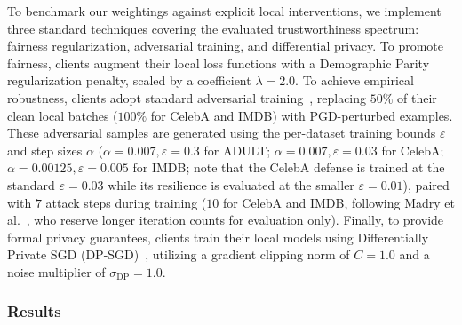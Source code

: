 \documentclass[acmsmall]{acmart}
\begin{document}
To benchmark our weightings against explicit local interventions, we implement three standard techniques covering the evaluated trustworthiness spectrum: fairness regularization, adversarial training, and differential privacy. To promote fairness, clients augment their local loss functions with a Demographic Parity regularization penalty, scaled by a coefficient $\lambda = 2.0$. To achieve empirical robustness, clients adopt standard adversarial training~\cite{madry2017towards}, replacing $50\%$ of their clean local batches ($100\%$ for CelebA and IMDB) with PGD-perturbed examples. These adversarial samples are generated using the per-dataset training bounds $\varepsilon$ and step sizes $\alpha$ ($\alpha=0.007, \varepsilon=0.3$ for ADULT; $\alpha=0.007, \varepsilon=0.03$ for CelebA; $\alpha=0.00125, \varepsilon=0.005$ for IMDB; note that the CelebA defense is trained at the standard $\varepsilon=0.03$ while its resilience is evaluated at the smaller $\varepsilon=0.01$), paired with $7$ attack steps during training ($10$ for CelebA and IMDB, following Madry et al.~\cite{madry2017towards}, who reserve longer iteration counts for evaluation only). Finally, to provide formal privacy guarantees, clients train their local models using Differentially Private SGD (DP-SGD)~\cite{abadi2016deep}, utilizing a gradient clipping norm of $C = 1.0$ and a noise multiplier of $\sigma_{\text{DP}} = 1.0$.

\subsubsection*{Results}
\end{document}

